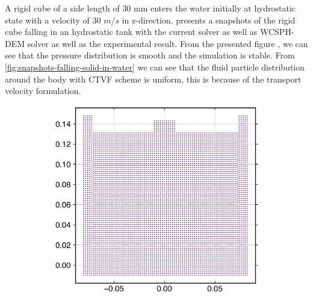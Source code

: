 A rigid cube of a side length of 30 mm enters the water initially at hydrostatic
state with a velocity of 30 $m/s$ in z-direction.
 presents a snapshots of the rigid
cube falling in an hydrostatic tank with the current solver as well as WCSPH-DEM
solver as well as the experimental result. From the presented figure
, we can see that the pressure
distribution is smooth and the simulation is stable. From
\cref{fig:snapshots-falling-solid-in-water} we can see that the fluid
particle distribution around the body with CTVF scheme is uniform, this
is because of the transport velocity formulation.
\begin{figure}[!htpb]
  \centering
  \begin{subfigure}{0.48\textwidth}
    \centering
    \includegraphics[width=1.0\textwidth]{figures/rfc/figures/qiu_2017_falling_solid_in_water_2d/dx_0_002/time0}
  \end{subfigure}
  \begin{subfigure}{0.48\textwidth}
    \centering

\end{subfigure}
\end{figure}
